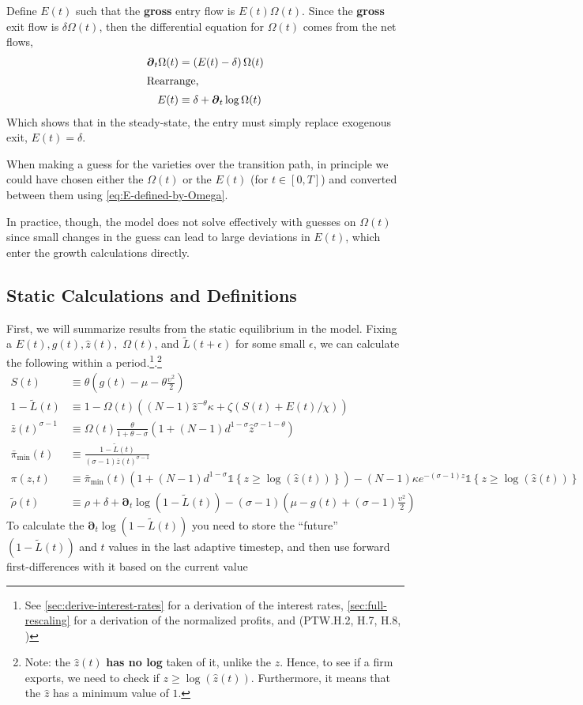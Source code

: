 \documentclass[11pt]{article}
\newcommand{\D}[1][]{\ensuremath{\boldsymbol{\partial}_{#1}}}
\newcommand{\indicator}[1]{\ensuremath{\mathds{1}\left\{{#1}\right\}}}
\begin{document}
Define $E(t)$ such that the \textbf{gross} entry flow is $E(t)\Omega(t)$.  Since the \textbf{gross} exit flow is $\delta \Omega(t)$, then the differential equation for $\Omega(t)$ comes from the net flows,
\begin{align}
	\D[t] \Omega(t) &= \left(E(t) - \delta \right)\Omega(t)\label{eq:E-defined-by-Omega}\\
	\intertext{Rearrange,}
	E(t) &\equiv \delta + \D[t]\log \Omega(t)
\end{align}
Which shows that in the steady-state, the entry must simply replace exogenous exit, $E(t) = \delta$.

When making a guess for the varieties over the transition path, in principle we could have chosen either the $\Omega(t)$ or the $E(t)$ (for $t \in [0,T]$) and converted between them using \cref{eq:E-defined-by-Omega}.

In practice, though, the model does not solve effectively with guesses on $\Omega(t)$ since small changes in the guess can lead to large deviations in $E(t)$, which enter the growth calculations directly.


\subsection{Static Calculations and Definitions}
First, we will summarize results from the static equilibrium in the model.  Fixing a $E(t), g(t), \hat{z}(t),$ $\Omega(t)$, and $\tilde{L}(t+\epsilon)$ for some small $\epsilon$, we can calculate the following within a period.\footnote{See \cref{sec:derive-interest-rates} for a derivation of the interest rates, \cref{sec:full-rescaling} for a derivation of the normalized profits, and (PTW.H.2, H.7, H.8, )}.\footnote{Note: the $\hat{z}(t)$ \textbf{has no log} taken of it, unlike the $z$.  Hence, to see if a firm exports, we need to check if $z \geq \log(\hat{z}(t))$.  Furthermore, it means that the $\hat{z}$ has a minimum value of $1$.}
\begin{align}
	S(t) &\equiv \theta \left( g(t) - \mu - \theta\frac{\upsilon^2}{2}\right)\\
	1 - \tilde{L}(t) &\equiv 1 - \Omega(t)\left((N -1)\hat{z}^{-\theta}\kappa + \zeta \left(S(t) + E(t)/\chi \right)\right)\\
	\bar{z}(t)^{\sigma - 1}&\equiv \Omega(t)
\frac{\theta}{1+\theta - \sigma}\left(1 + (N-1)d^{1-\sigma}\hat{z}^{\sigma - 1 -\theta} \right)\\
	\bar{\pi}_{\min}(t) &\equiv \frac{1-\tilde{L}(t)}{(\sigma-1)\bar{z}(t)^{\sigma-1}}\\
	\pi(z,t) &\equiv \bar{\pi}_{\min}(t)\left(1 + (N-1)d^{1-\sigma}\indicator{z \geq \log(\hat{z}(t))}\right) - (N-1)\kappa e^{-(\sigma - 1)z}\indicator{z \geq \log(\hat{z}(t))}\\
	\tilde{\rho}(t) &\equiv \rho+ \delta + \D[t]\log\left(1 - \tilde{L}(t)\right) - (\sigma - 1)\left(\mu - g(t) + (\sigma - 1)\frac{\upsilon^2}{2} \right)
\end{align}
To calculate the $\D[t]\log\left(1 - \tilde{L}(t)\right)$ you need to store the ``future'' $\left(1 - \tilde{L}(t)\right)$ and $t$ values in the last adaptive timestep, and then use forward first-differences with it based on the current value
\end{document}
